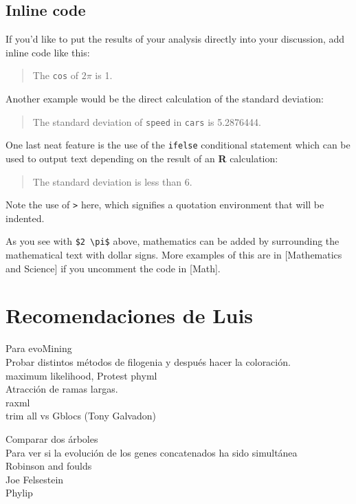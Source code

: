 \documentclass[12pt,twoside]{reedthesis}
\begin{document}
  \subsection{Inline code}\label{inline-code}
  
  If you'd like to put the results of your analysis directly into your
  discussion, add inline code like this:
  
  \begin{quote}
  The \texttt{cos} of \(2 \pi\) is 1.
  \end{quote}
  
  Another example would be the direct calculation of the standard
  deviation:
  
  \begin{quote}
  The standard deviation of \texttt{speed} in \texttt{cars} is 5.2876444.
  \end{quote}
  
  One last neat feature is the use of the \texttt{ifelse} conditional
  statement which can be used to output text depending on the result of an
  \textbf{R} calculation:
  
  \begin{quote}
  The standard deviation is less than 6.
  \end{quote}
  
  Note the use of \texttt{\textgreater{}} here, which signifies a
  quotation environment that will be indented.
  
  As you see with \texttt{\$2\ \textbackslash{}pi\$} above, mathematics
  can be added by surrounding the mathematical text with dollar signs.
  More examples of this are in {[}Mathematics and Science{]} if you
  uncomment the code in {[}Math{]}.
  
  \section{Recomendaciones de Luis}\label{recomendaciones-de-luis}
  
  Para evoMining\\
  Probar distintos métodos de filogenia y después hacer la coloración.\\
  maximum likelihood, Protest phyml\\
  Atracción de ramas largas.\\
  raxml\\
  trim all vs Gblocs (Tony Galvadon)
  
  Comparar dos árboles\\
  Para ver si la evolución de los genes concatenados ha sido simultánea\\
  Robinson and foulds\\
  Joe Felsestein\\
  Phylip
  
\end{document}
